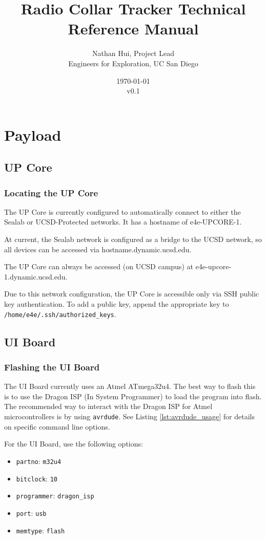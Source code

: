 \documentclass{report}
\title{Radio Collar Tracker Technical Reference Manual}
\author{Nathan Hui, Project Lead\\Engineers for Exploration, UC San Diego}
\date{\today\\v0.1}
\begin{document}
	\maketitle
	\tableofcontents
	\listoffigures
	\listoftables
	\lstlistoflistings
	\chapter{Payload}
		\section{UP Core}
			\subsection{Locating the UP Core}
				The UP Core is currently configured to automatically connect to either the Sealab or UCSD-Protected networks.  It has a hostname of e4e-UPCORE-1.

				At current, the Sealab network is configured as a bridge to the UCSD network, so all devices can be accessed via hostname.dynamic.ucsd.edu.

				The UP Core can always be accessed (on UCSD campus) at e4e-upcore-1.dynamic.ucsd.edu.

				Due to this network configuration, the UP Core is accessible only via SSH public key authentication.  To add a public key, append the appropriate key to \lstinline[language=sh]{/home/e4e/.ssh/authorized_keys}.
		\section{UI Board} \label{sec:ui}
			\subsection{Flashing the UI Board} \label{ssec:flash_ui}
				The UI Board currently uses an Atmel ATmega32u4.  The best way to flash this is to use the Dragon ISP (In System Programmer) to load the program into flash.  The recommended way to interact with the Dragon ISP for Atmel microcontrollers is by using \lstinline[language=sh]{avrdude}.  See Listing \ref{lst:avrdude_usage} for details on specific command line options.

				For the UI Board, use the following options:

				\begin{itemize}
					\item \lstinline{partno}: \lstinline{m32u4}
					\item \lstinline{bitclock}: \lstinline{10}
					\item \lstinline{programmer}: \lstinline{dragon_isp}
					\item \lstinline{port}: \lstinline{usb}
					\item \lstinline{memtype}: \lstinline{flash}
				\end{itemize}
				
\end{document}
